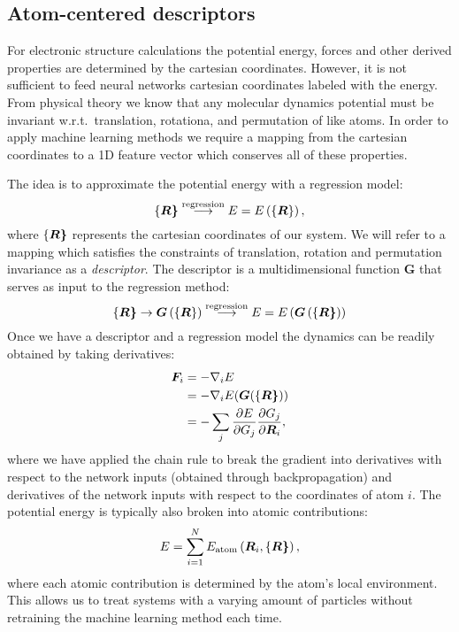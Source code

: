 \subsection{Atom-centered descriptors}
For electronic structure calculations the potential energy,
forces and other derived properties are determined by
the cartesian coordinates. However, it is not sufficient
to feed neural networks cartesian coordinates labeled with
the energy. From physical theory we know that any molecular dynamics potential
must be invariant w.r.t.\ translation, rotationa, and permutation
of like atoms.
In order to apply machine learning methods we require a mapping from
the cartesian coordinates to a 1D feature vector which conserves
all of these properties.
\par
The idea is to approximate the potential energy with a regression model:
\begin{equation}
\left\{\bm{R\right\}} \overset{\text{regression}}{\longrightarrow}
    E = E\left( \left\{\bm{R}\right\} \right) ,
\end{equation}
where $\left\{\bm{R\right\}}$ represents the cartesian coordinates of our system.
We will refer to a mapping which satisfies the constraints of 
translation, rotation and permutation invariance as a \textit{descriptor}. 
The descriptor is a multidimensional function $\bm{G}$ that serves as input to
the regression method:
\begin{equation}
    \left\{\bm{R\right\}} \rightarrow \bm{G} \left(\left\{\bm{R}\right\} \right)
\overset{\text{regression}}{\longrightarrow}
E = E \left(\bm{G}\left(\left\{\bm{R\right\}}\right)\right)
\end{equation}
Once we have a descriptor and a regression model the dynamics
can be readily obtained by taking derivatives:
\begin{equation}
\begin{split}
    \bm{F}_i &= -\nabla_i E \\
    &= -\nabla_i
    E(\bm{G}(\left\{\bm{R\right\}})) \\
    &= -\sum_j \frac{\partial E}
    {\partial G_j} \frac{\partial G_j}{\partial \bm{R}_i} ,
\end{split}
\end{equation}
where we have applied the chain rule to break the gradient
into derivatives with respect to the network inputs (obtained through
backpropagation) and derivatives of the network inputs with
respect to the coordinates of atom $i$.
The potential energy is typically also broken into
atomic contributions:
\begin{equation}
E = \sum_{i=1}^N E_{\text{atom}}\left(\bm{R}_i, \left\{\bm{R\right\}} \right) ,
\end{equation}
where each atomic contribution is determined by the atom's
local environment. This allows us to treat systems with
a varying amount of particles without retraining
the machine learning method each time.


